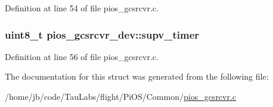 \-Definition at line 54 of file pios\-\_\-gcsrcvr.\-c.

\hypertarget{structpios__gcsrcvr__dev_a3f792c850523f7eba7efbb0aeebeba37}{
\subsubsection[{supv\-\_\-timer}]{\setlength{\rightskip}{0pt plus 5cm}uint8\-\_\-t {\bf pios\-\_\-gcsrcvr\-\_\-dev\-::supv\-\_\-timer}}}\label{structpios__gcsrcvr__dev_a3f792c850523f7eba7efbb0aeebeba37}


\-Definition at line 56 of file pios\-\_\-gcsrcvr.\-c.



\-The documentation for this struct was generated from the following file\-:\begin{DoxyCompactItemize}
\item 
/home/jb/code/\-Tau\-Labs/flight/\-Pi\-O\-S/\-Common/\hyperlink{pios__gcsrcvr_8c}{pios\-\_\-gcsrcvr.\-c}\end{DoxyCompactItemize}
